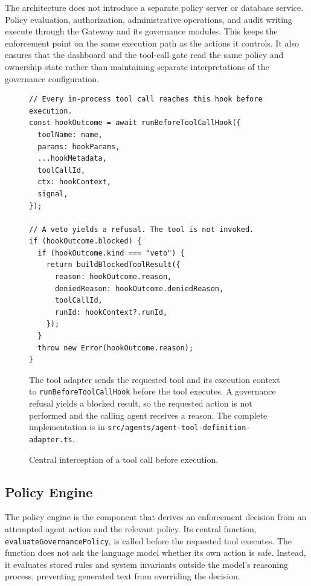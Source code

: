 The architecture does not introduce a separate policy server or database
service. Policy evaluation, authorization, administrative operations, and audit
writing execute through the Gateway and its governance modules. This keeps the
enforcement point on the same execution path as the actions it controls. It
also ensures that the dashboard and the tool-call gate read the same policy and
ownership state rather than maintaining separate interpretations of the
governance configuration.

\begin{figure}[htbp]
\centering
\begin{minipage}{0.96\textwidth}
\begin{reportcodebox}
\begin{lstlisting}[style=reportcode]
// Every in-process tool call reaches this hook before execution.
const hookOutcome = await runBeforeToolCallHook({
  toolName: name,
  params: hookParams,
  ...hookMetadata,
  toolCallId,
  ctx: hookContext,
  signal,
});

// A veto yields a refusal. The tool is not invoked.
if (hookOutcome.blocked) {
  if (hookOutcome.kind === "veto") {
    return buildBlockedToolResult({
      reason: hookOutcome.reason,
      deniedReason: hookOutcome.deniedReason,
      toolCallId,
      runId: hookContext?.runId,
    });
  }
  throw new Error(hookOutcome.reason);
}
\end{lstlisting}
\end{reportcodebox}
\end{minipage}
\caption{Central interception of a tool call before execution.}
\label{fig:gov-code-central-interception}
\vspace{0.6em}
\begin{minipage}{0.96\textwidth}
{\small The tool adapter sends the requested tool and its execution context to \texttt{runBeforeToolCallHook} before the tool executes. A governance refusal yields a blocked result, so the requested action is not performed and the calling agent receives a reason. The complete implementation is in \texttt{src/agents/agent-tool-definition-adapter.ts}.\par}
\end{minipage}
\end{figure}

\FloatBarrier

\subsection{Policy Engine}
\label{sec:gov-gate}
The policy engine is the component that derives an enforcement
decision from an attempted agent action and the relevant policy. Its central
function, \texttt{evaluateGovernancePolicy}, is called before the requested
tool executes. The function does not ask the language model whether its own
action is safe. Instead, it evaluates stored rules and system invariants
outside the model's reasoning process, preventing generated text from
overriding the decision.

